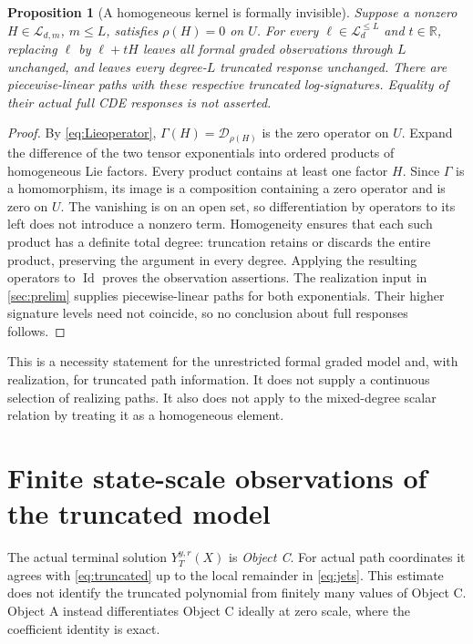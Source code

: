 \documentclass[11pt,a4paper]{article}
\numberwithin{equation}{section}
\newtheorem{proposition}[theorem]{Proposition}
\theoremstyle{definition}
\theoremstyle{remark}
\DeclareMathOperator{\Id}{Id}
\newcommand{\R}{\mathbb R}
\newcommand{\Lie}{\mathcal L}
\newcommand{\Dop}{\mathcal D}
\begin{document}
\begin{proposition}[A homogeneous kernel is formally invisible]
\label{prop:kernel}
Suppose a nonzero $H\in\Lie_{d,m}$, $m\leq L$, satisfies
$\rho(H)=0$ on $U$. For every $\ell\in\Lie_d^{\leq L}$ and $t\in\R$,
replacing $\ell$ by $\ell+tH$ leaves all formal graded observations
through $L$ unchanged, and leaves every degree-$L$ truncated response
unchanged. There are piecewise-linear paths with these respective
truncated log-signatures. Equality of their actual full CDE responses is
not asserted.
\end{proposition}
\begin{proof}
By \eqref{eq:Lieoperator}, $\Gamma(H)=\Dop_{\rho(H)}$ is the zero
operator on $U$. Expand the difference of the two tensor exponentials
into ordered products of homogeneous Lie factors. Every product contains
at least one factor $H$. Since $\Gamma$ is a homomorphism, its image
is a composition containing a zero operator and is zero on $U$.
The vanishing is on an open set, so differentiation by operators to its
left does not introduce a nonzero term. Homogeneity ensures that each
such product has a definite total degree: truncation retains or discards
the entire product, preserving the argument in every degree. Applying
the resulting operators to $\Id$ proves the observation assertions.
The realization input in \cref{sec:prelim} supplies piecewise-linear
paths for both exponentials. Their higher signature levels need not
coincide, so no conclusion about full responses follows.
\end{proof}
This is a necessity statement for the unrestricted formal graded model
and, with realization, for truncated path information. It does not supply
a continuous selection of realizing paths. It also does not apply to the
mixed-degree scalar relation by treating it as a homogeneous element.

\section{Finite state-scale observations of the truncated model}
\label{sec:finite}
The actual terminal solution $Y_T^{y,r}(X)$ is \emph{Object C}. For actual
path coordinates it agrees with \eqref{eq:truncated} up to the local
remainder in \eqref{eq:jets}. This estimate does not identify the
truncated polynomial from finitely many values of Object C. Object A
instead differentiates Object C ideally at zero scale, where the
coefficient identity is exact.
\end{document}
